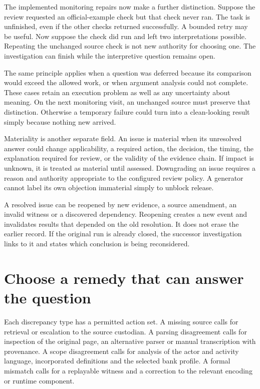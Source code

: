 The implemented monitoring repairs now make a further distinction. Suppose the
review requested an official-example check but that check never ran. The task
is unfinished, even if the other checks returned successfully. A bounded retry
may be useful. Now suppose the check did run and left two interpretations
possible. Repeating the unchanged source check is not new authority for choosing
one. The investigation can finish while the interpretive question remains open.

The same principle applies when a question was deferred because its comparison
would exceed the allowed work, or when argument analysis could not complete.
These cases retain an execution problem as well as any uncertainty about
meaning. On the next monitoring visit, an unchanged source must preserve that
distinction. Otherwise a temporary failure could turn into a clean-looking
result simply because nothing new arrived.

Materiality is another separate field. An issue is material when its unresolved
answer could change applicability, a required action, the decision, the timing,
the explanation required for review, or the validity of the evidence chain. If
impact is unknown, it is treated as material until assessed. Downgrading an issue
requires a reason and authority appropriate to the configured review policy.
A generator cannot label its own objection immaterial simply to unblock release.

A resolved issue can be reopened by new evidence, a source amendment, an invalid
witness or a discovered dependency. Reopening creates a new event and invalidates
results that depended on the old resolution. It does not erase the earlier
record. If the original run is already closed, the successor investigation links
to it and states which conclusion is being reconsidered.

\section{Choose a remedy that can answer the question}
\label{merge:M06:08}


Each discrepancy type has a permitted action set. A missing source calls for
retrieval or escalation to the source custodian. A parsing disagreement calls for
inspection of the original page, an alternative parser or manual transcription
with provenance. A scope disagreement calls for analysis of the actor and
activity language, incorporated definitions and the selected bank profile. A
formal mismatch calls for a replayable witness and a correction to the relevant
encoding or runtime component.

